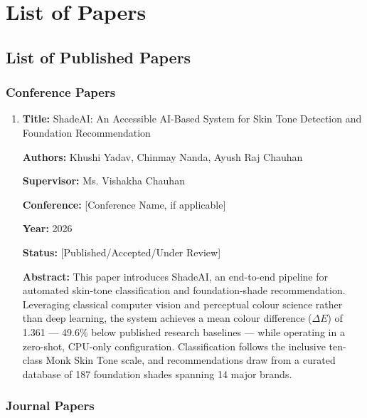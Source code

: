 \appendix
\chapter{List of Papers}

\section{List of Published Papers}

\subsection{Conference Papers}

\begin{enumerate}
    \item \textbf{Title:} ShadeAI: An Accessible AI-Based System for Skin Tone Detection and Foundation Recommendation
    
    \textbf{Authors:} Khushi Yadav, Chinmay Nanda, Ayush Raj Chauhan
    
    \textbf{Supervisor:} Ms. Vishakha Chauhan
    
    \textbf{Conference:} [Conference Name, if applicable]
    
    \textbf{Year:} 2026
    
    \textbf{Status:} [Published/Accepted/Under Review]
    
    \textbf{Abstract:} This paper introduces ShadeAI, an end-to-end pipeline for automated skin-tone classification and foundation-shade recommendation. Leveraging classical computer vision and perceptual colour science rather than deep learning, the system achieves a mean colour difference ($\Delta E$) of 1.361 — 49.6\% below published research baselines — while operating in a zero-shot, CPU-only configuration. Classification follows the inclusive ten-class Monk Skin Tone scale, and recommendations draw from a curated database of 187 foundation shades spanning 14 major brands.
\end{enumerate}

\subsection{Journal Papers}

